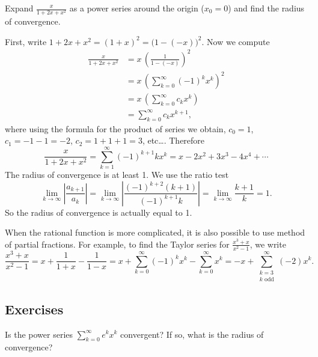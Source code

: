 \documentclass[12pt]{book}
\begin{document}
\begin{example}
Expand $\frac{x}{1+2x+x^2}$ as a power series around the origin ($x_0 = 0$) and
find the radius of convergence.

First, write $1+2x+x^2 = {(1+x)}^2 = {\bigl(1-(-x)\bigr)}^2$.  Now we
compute
\begin{equation*}
\begin{split}
\frac{x}{1+2x+x^2}
&=
x \,
{\left(
\frac{1}{1-(-x)}
\right)}^2
\\
&=
x \,
{ \left( 
\sum_{k=0}^\infty {(-1)}^k x^k 
\right)}^2
\\
&=
x \,
\left(
\sum_{k=0}^\infty c_k x^k 
\right)
\\
&=
\sum_{k=0}^\infty c_k x^{k+1} ,
\end{split}
\end{equation*}
where using the formula for the product of series
we obtain, $c_0 = 1$, $c_1 = -1 -1 = -2$, $c_2 = 1+1+1 = 3$, etc\ldots.
Therefore
\begin{equation*}
\frac{x}{1+2x+x^2}
=
\sum_{k=1}^\infty {(-1)}^{k+1} k x^k
= x-2x^2+3x^3-4x^4+\cdots
\end{equation*}
The radius of convergence is at least 1.  We use the ratio test
\begin{equation*}
\lim_{k\to\infty}
\left\lvert \frac{a_{k+1}}{a_k} \right\rvert
=
\lim_{k\to\infty}
\left\lvert \frac{{(-1)}^{k+2} (k+1)}{{(-1)}^{k+1}k} \right\rvert
=
\lim_{k\to\infty}
\frac{k+1}{k}
= 1 .
\end{equation*}
So the radius of convergence is actually equal to 1.
\end{example}

When the rational function is more complicated, it is also possible
to use method of partial fractions.  For example,
to find the Taylor series for $\frac{x^3+x}{x^2-1}$, we write
\begin{equation*}
\frac{x^3+x}{x^2-1}
=
x + \frac{1}{1+x} - \frac{1}{1-x}
=
x + \sum_{k=0}^\infty {(-1)}^k x^k - \sum_{k=0}^\infty x^k
=
- x + \sum_{\substack{k=3 \\ k \text{ odd}}}^\infty (-2) x^k .
\end{equation*}

\subsection{Exercises}

\begin{exercise}
Is the power series $\displaystyle \sum_{k=0}^\infty e^k x^k$ convergent?
If so, what is the radius of convergence?
\end{exercise}
\end{document}

